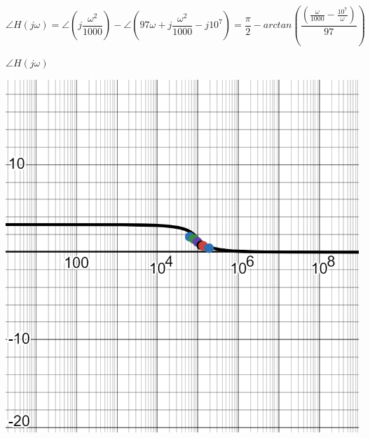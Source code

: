 \documentclass[a4 paper]{article}
\begin{document}
\newpage
\[\angle H(j\omega) = \angle\left(j\frac{\omega^2}{1000} \right)- \angle\left(97\omega+j\frac{\omega^2}{1000}-j10^7\right) = \frac{\pi}{2}-arctan\left(\frac{\left(\frac{\omega}{1000}-\frac{10^7}{\omega}\right)}{97}\right)\]

\hspace{0.5cm}$\angle H(j\omega)$
\begin{table}[h]
\centering
\includegraphics[scale=0.45]{figuras/circ3-fase}
\end{table}\vspace{-6.75cm}\marginpar{\textbf{$\omega$}}
\vspace{6.5cm}
\end{document}
